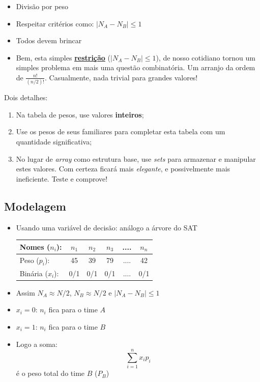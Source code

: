 \begin{itemize}
\item Divisão  por peso
\item Respeitar  critérios como: $|N_A - N_B| \le 1$
\item Todos devem brincar

\item \textsf{Bem, esta simples {\bf \underline{restrição}} ({\bf $|N_A - N_B| \le 1$}), de nosso cotidiano tornou um simples problema em mais uma questão combinatória.
 Um arranjo da ordem de  $\frac{n!}{(n/2)!}$.
 Casualmente, nada trivial  para grandes valores! }
 \end{itemize}


 Dois detalhes:

\begin{enumerate}
\item Na tabela de pesos, use valores {\bf inteiros};

\item Use os pesos de seus familiares para completar esta tabela
com um quantidade significativa;

\item No lugar de {\em array} como estrutura base, use {\em sets} para armazenar
e manipular estes valores. Com certeza ficará mais  {\em elegante}, e 
possivelmente mais ineficiente. Teste e comprove!

\end{enumerate}


\subsection{Modelagem}

 \begin{itemize}

  \item Usando uma variável de decisão: análogo a árvore do SAT  
 
\begin{center}
\begin{tabular}{|l|c|c|c|c|c|}
\hline
Nomes ($n_i$): & $n_1$ & $n_2$ & $n_3$ & .... & $n_n$ \\ \hline
Peso ($p_i$): & 45 & 39 & 79 & .... & 42  \\ \hline
Binária ($x_i$): & 0/1 & 0/1 & 0/1 & .... & 0/1  \\ \hline
\end{tabular}
\end{center}
  
\item Assim $N_A \approx N/2$, $N_B \approx N/2$  e  $|N_A - N_B| \le 1$   

\item $x_i = 0$: $n_i$ fica para o time $A$
\item $x_i = 1$: $n_i$ fica para o time $B$
\item Logo a soma:
$$\sum_{i=1}^n x_i p_i$$ é o peso total do time $B$ ($P_B$)
  
  \end{itemize}

